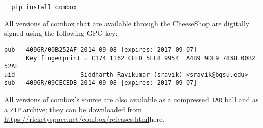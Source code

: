 \begin{verbatim}
  pip install combox
\end{verbatim}

All versions of combox that are available through the CheeseShop are
digitally signed using the following GPG key:

\begin{verbatim}
pub   4096R/00B252AF 2014-09-08 [expires: 2017-09-07]
      Key fingerprint = C174 1162 CEED 5FE8 9954  A4B9 9DF9 7838 00B2 52AF
uid                  Siddharth Ravikumar (sravik) <sravik@bgsu.edu>
sub   4096R/09CECEDB 2014-09-08 [expires: 2017-09-07]
\end{verbatim}

All versions of combox's source are also available as a compressed
\verb+TAR+ ball and as a \verb+ZIP+ archive; they can be downloaded
from \url{https://ricketyspace.net/combox/releases.html}{here}.
